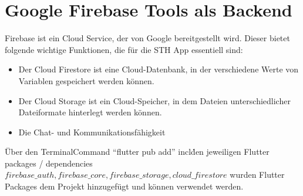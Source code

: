 \section{Google Firebase Tools als Backend}
Firebase ist ein Cloud Service, der von Google bereitgestellt wird.
Dieser bietet folgende wichtige Funktionen, die für die STH App essentiell sind:
\begin{itemize}
    \item Der Cloud Firestore ist eine Cloud-Datenbank, in der verschiedene Werte von Variablen gespeichert werden können.
    \item Der Cloud Storage ist ein Cloud-Speicher, in dem Dateien unterschiedlicher Dateiformate hinterlegt werden können.
    \item Die Chat- und Kommunikationsfähigkeit
\end{itemize}
Über den Terminal\-Command ``flutter pub add'' incl\. den jeweiligen Flutter packages / dependencies \(firebase\_auth, firebase\_core, firebase\_storage, cloud\_firestore\) wurden Flutter Packages dem Projekt hinzugefügt und können verwendet werden.

